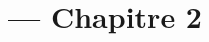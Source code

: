 
\title{\TSwiftTitle{} --- Chapitre 2}

\newcommand{\TSwiftRoot}[0]{../..}



\maketitle

\tableofcontents




